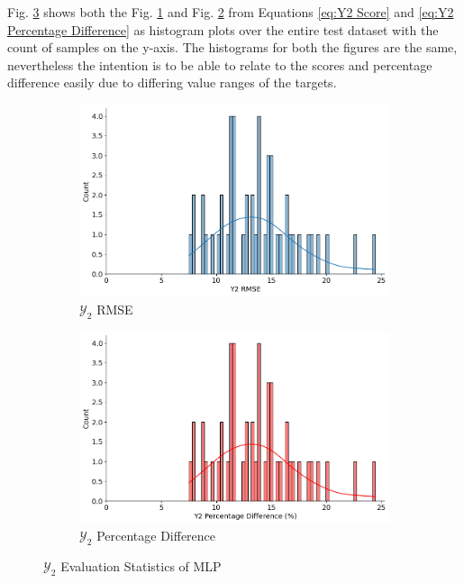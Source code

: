 \documentclass{report} %
\begin{document}
Fig. \ref{fig:Y2 Evaluation Statistics MLP} shows both the Fig. \ref{fig:Y2 RMSE} and Fig. \ref{fig:Y2 Percentage Difference} from Equations \ref{eq:Y2 Score} 
and \ref{eq:Y2 Percentage Difference} as histogram plots over the entire test dataset with the count of samples on the y-axis.
The histograms for both the figures are the same, nevertheless the intention is to be able to relate to the scores and percentage difference easily due to differing 
value ranges of the targets.
\begin{figure}[H]
    \centering
    \begin{subfigure}{0.5\textwidth}
        \centering
        \includegraphics[width=\textwidth]{./ReportImages/score_MLP_y2.png}
        \caption{$\mathcal{Y}_2$ \ac{RMSE}}
        \label{fig:Y2 RMSE}
    \end{subfigure}\hfill
    \begin{subfigure}{0.5\textwidth}
        \centering
        \includegraphics[width=\textwidth]{./ReportImages/percentage_diff_MLP_y2.png}
        \caption{$\mathcal{Y}_2$ Percentage Difference}
        \label{fig:Y2 Percentage Difference}
    \end{subfigure}
    \caption{$\mathcal{Y}_2$ Evaluation Statistics of \ac{MLP}}
    \label{fig:Y2 Evaluation Statistics MLP}
\end{figure}
\end{document}
